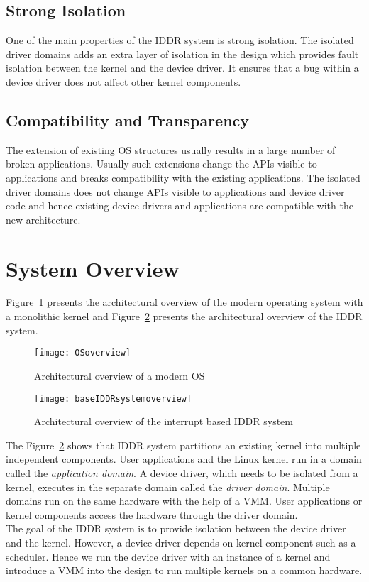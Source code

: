 \subsection*{Strong Isolation}
One of the main properties of the IDDR system is strong isolation. The isolated driver domains adds an extra layer of isolation in the design which provides fault isolation between the kernel and the device driver. It ensures that a bug within a device driver does not affect other kernel components.

\subsection*{Compatibility and Transparency} 
The extension of existing OS structures usually results in a large number of broken applications. Usually such extensions change the APIs visible to applications and breaks compatibility with the existing applications. The isolated driver domains does not change APIs visible to applications and device driver code and hence existing device drivers and applications are compatible with the new architecture.

\section{System Overview}\label{overview}

Figure~\ref{fig:monolithic} presents the architectural overview of the modern operating system with a monolithic kernel and Figure~\ref{fig:base IDDR system overview} presents the architectural overview of the IDDR system.
\\[3mm]
\begin{figure}[!ht]
\centering
\texttt{[image: OSoverview]}
\caption{Architectural overview of a modern OS}
\label{fig:monolithic}
\end{figure}

\begin{figure}[!ht]
\centering
\texttt{[image: baseIDDRsystemoverview]}
\caption{Architectural overview of the interrupt based IDDR system}
\label{fig:base IDDR system overview}
\end{figure}
The Figure~\ref{fig:base IDDR system overview} shows that IDDR system partitions an existing kernel into multiple independent components. User applications and the Linux kernel run in a domain called the \textit{application domain}. A device driver, which needs to be isolated from a kernel, executes in the separate domain called the \textit{driver domain}. Multiple domains run on the same hardware with the help of a VMM. User applications or kernel components access the hardware through the driver domain.
\\[3mm]
The goal of the IDDR system is to provide isolation between the device driver and the kernel. However, a device driver depends on kernel component such as a scheduler. Hence we run the device driver with an instance of a kernel and introduce a VMM into the design to run multiple kernels on a common hardware. 


